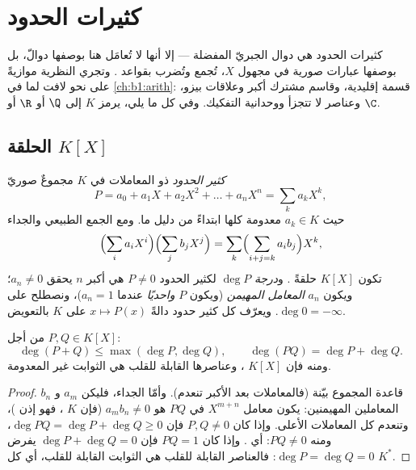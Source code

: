 \chapter{كثيرات الحدود}\label{ch:b1:poly}

كثيرات الحدود هي دوال الجبريّ المفضلة --- إلا أنها
لا تُعامَل هنا بوصفها دوالّ، بل بوصفها عبارات صورية في
مجهول $X$، تُجمع وتُضرب بقواعد 
. وتجري النظرية موازيةً على نحو لافت لما في \cref{ch:b1:arith}: قسمة إقليدية، وقاسم مشترك أكبر وعلاقات بيزو،
وعناصر لا تتجزأ ووحدانية التفكيك. وفي كل ما يلي، يرمز $K$
إلى $\Q$ أو $\R$ أو $\C$.

\section{الحلقة $K[X]$}

\begin{definition}\label{def:b1:poly:def}
\emph{كثير الحدود} ذو المعاملات في $K$ مجموعٌ
صوريّ
\[
P = a_0 + a_1 X + a_2 X^2 + \dots + a_n X^n
= \sum_{k} a_k X^k,
\]
حيث $a_k \in K$ معدومة كلها ابتداءً من دليل ما. ومع الجمع
الطبيعي والجداء
\[
\Bigl(\sum_i a_i X^i\Bigr)\Bigl(\sum_j b_j X^j\Bigr)
= \sum_k \Bigl(\sum_{i+j=k} a_i b_j\Bigr) X^k,
\]
تكون  $K[X]$ حلقةً . و\emph{درجة} $\deg P$ لكثير الحدود
$P \neq 0$ هي أكبر $n$ يحقق $a_n \neq 0$؛ ويكون $a_n$
\emph{المعامل المهيمن} (ويكون $P$ \emph{واحديًا} عندما $a_n = 1$)، ونصطلح على $\deg 0 = -\infty$.
ويعرّف كل كثير حدود دالةً $x \mapsto P(x)$ على $K$ بالتعويض.
\end{definition}

\begin{proposition}\label{prop:b1:poly:degree}
من أجل $P, Q \in K[X]$:
\[
\deg(P + Q) \leq \max(\deg P, \deg Q),
\qquad
\deg(PQ) = \deg P + \deg Q .
\]
ومنه فإن $K[X]$ ، وعناصرها القابلة للقلب هي
الثوابت غير المعدومة.
\end{proposition}

\begin{proof}
قاعدة المجموع بيّنة (فالمعاملات بعد الأكبر تنعدم). وأمّا
الجداء، فليكن $a_m$ و $b_n$ المعاملين المهيمنين: يكون
معامل $X^{m+n}$ في $PQ$ هو $a_m b_n \neq 0$ (فإن $K$
، فهو إذن )، وتنعدم كل المعاملات الأعلى.
وإذا كان $P, Q \neq 0$ فإن $\deg PQ = \deg P + \deg Q \geq 0$، ومنه $PQ \neq
0$: أي . وإذا كان $PQ = 1$ فإن $\deg P + \deg Q = 0$ يفرض
$\deg P = \deg Q = 0$: فالعناصر القابلة للقلب هي الثوابت
القابلة للقلب، أي كل $K^*$.
\end{proof}

